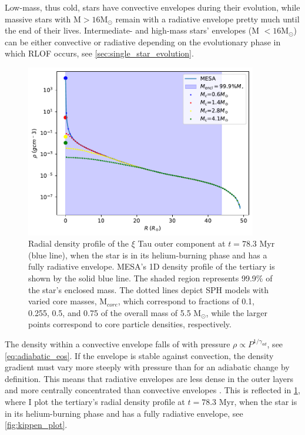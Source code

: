 Low-mass, thus cold, stars have convective envelopes during their evolution, while massive stars with M$>16$M$_{\odot}$ remain with a radiative envelope pretty much until the end of their lives. Intermediate- and high-mass stars' envelopes (M  $<16$M$_{\odot}$) can be either convective or radiative depending on the evolutionary phase in which RLOF occurs, see \cref{sec:single_star_evolution}. 
\begin{figure}[H]
    \centering
    \includegraphics[width=0.9\textwidth]{Thesis/graphs/density_profile_radiative_envelope.pdf}
    \caption{Radial density profile of the  $\xi$ Tau outer component at $t=78.3$ Myr (blue line), when the star is in its helium-burning phase and has a fully radiative envelope. MESA's 1D density profile of the tertiary is shown by the solid blue line. The shaded region represents 99.9\% of the star's enclosed mass. The dotted lines depict SPH models with varied core masses, M$_{core}$, which correspond to fractions of 0.1, 0.255, 0.5, and 0.75 of the overall mass of 5.5 M$_{\odot}$, while the larger points correspond to core particle densities, respectively.}
    \label{fig:density_profile_radiative}
\end{figure}
The density within a convective envelope falls of with pressure $\rho \propto P^{1/\gamma_{ad}}$, see \cref{eq:adiabatic_eos}. If the envelope is stable against convection, the density gradient must vary more steeply with pressure than for an adiabatic change by definition. This means that radiative envelopes are less dense in the outer layers and more centrally concentrated than convective envelopes \cite{pols2011stellar}. This is reflected in \cref{fig:density_profile_radiative}, where I plot the tertiary's radial density profile at $t=78.3$ Myr, when the star is in its helium-burning phase and has a fully radiative envelope, see \cref{fig:kippen_plot}.

